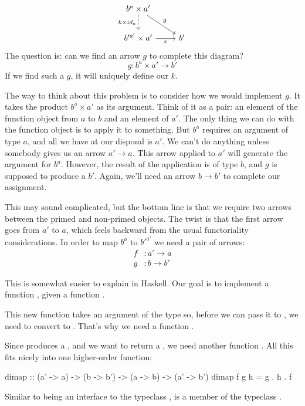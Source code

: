 \documentclass[DaoFP]{subfiles}
\begin{document}
\[
 \begin{tikzcd}
 b^a \times a'
 \arrow[d, dashed, "k \times id_a"']
 \arrow[rd, "g"]
 \\
 b'^{a'} \times a'
 \arrow[r, "\varepsilon"']
& b'
 \end{tikzcd}
\]
The question is: can we find an arrow $g$ to complete this diagram? 
\[g \colon b^a \times a' \to b'\]
If we find such a $g$, it will uniquely define our $k$.

The way to think about this problem is to consider how we would implement $g$. It takes the product $b^a \times a'$ as its argument. Think of it as a pair: an element of the function object from $a$ to $b$ and an element of $a'$. The only thing we can do with the function object is to apply it to something. But $b^a$ requires an argument of type $a$, and all we have at our disposal is $a'$. We can't do anything unless somebody gives us an arrow $a' \to a$. This arrow applied to $a'$ will generate the argument for $b^a$. However, the result of the application is of type $b$, and $g$ is supposed to produce a $b'$. Again, we'll need an arrow $b \to b'$ to complete our assignment. 

This may sound complicated, but the bottom line is that we require two arrows between the primed and non-primed objects. The twist is that the first arrow goes from $a'$ to $a$, which feels backward from the usual functoriality considerations. In order to map $b^a$ to $b'^{a'}$ we need a pair of arrows:
\begin{align*}
f &\colon a' \to a \\
g &\colon b \to b' 
\end{align*}

This is somewhat easier to explain in Haskell. Our goal is to implement a function , given a function . 

This new function takes an argument of the type  so, before we can pass it to , we need to convert  to . That's why we need a function . 

Since  produces a , and we want to return a , we need another function . All this fits nicely into one higher-order function:
\begin{haskell}
dimap :: (a' -> a) -> (b -> b') -> (a -> b) -> (a' -> b')
dimap f g h = g . h . f
\end{haskell}
Similar to  being an interface to the typeclass ,  is a member of the typeclass .
\end{document}
